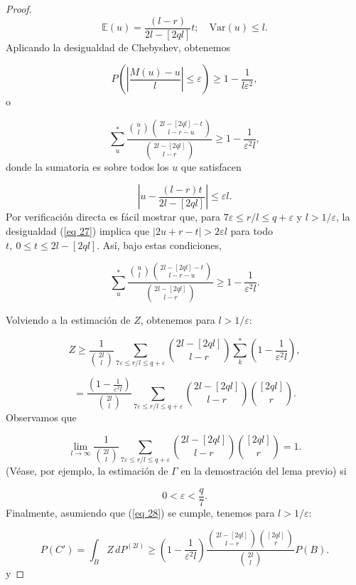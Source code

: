 \documentclass{report}
\begin{document}
\begin{proof}
\[
\mathbb{E}(u) = \frac{(l - r)}{2l - [2q l]} t; \quad \text{Var}(u) \leq l.
\]
Aplicando la desigualdad de Chebyshev, obtenemos

\[
P \left( \left| \frac{M(u) - u}{l} \right| \leq \varepsilon \right) \geq 1 - \frac{1}{l \varepsilon^2},
\]
o 

\[
\sum_u^* \frac{\binom{u}{l} \binom{2l - [2q l] - t}{l - r - u}}{\binom{2l - [2q l]}{l - r}} \geq 1 - \frac{1}{\varepsilon^2 l},
\]
donde la sumatoria es sobre todos los \( u \) que satisfacen

\begin{equation}\label{eq 27}
    \left| u - \frac{(l - r) t}{2l - [2q l]} \right| \leq \varepsilon l.
\end{equation}
Por verificación directa es fácil mostrar que, para \( 7 \varepsilon \leq r/l \leq q + \varepsilon \) y \( l > 1/\varepsilon \),
la desigualdad (\ref{eq 27}) implica que \( |2u + r - t| > 2 \varepsilon l \) para todo \( t, \ 0 \leq t \leq 2l - [2q l] \).
Así, bajo estas condiciones,

\[
\sum_u^* \frac{\binom{u}{l} \binom{2l - [2q l] - t}{l - r - u}}{\binom{2l - [2q l]}{l - r}} \geq 1 - \frac{1}{\varepsilon^2 l}.
\]\newline

Volviendo a la estimación de \( Z \), obtenemos para \( l > 1/\varepsilon \):

\[
Z \geq \frac{1}{\binom{2l}{l}} \sum_{7 \varepsilon \leq r/l \leq q + \varepsilon} \binom{2l - [2q l]}{l - r} \sum_k^* \left( 1 - \frac{1}{\varepsilon^2 l} \right),
\]

\[
= \frac{\left( 1 - \frac{1}{\varepsilon^2 l} \right)}{\binom{2l}{l}} \sum_{7 \varepsilon \leq r/l \leq q + \varepsilon} \binom{2l - [2q l]}{l - r} \binom{[2q l]}{r}.
\]
Observamos que

\[
\lim_{l \to \infty} \frac{1}{\binom{2l}{l}} \sum_{7 \varepsilon \leq r/l \leq q + \varepsilon} \binom{2l - [2q l]}{l - r} \binom{[2q l]}{r} = 1.
\]
(Véase, por ejemplo, la estimación de \( \Gamma \) en la demostración del lema previo) si 

\begin{equation}\label{eq 28}
0 < \varepsilon < \frac{q}{7}.
\end{equation}
Finalmente, asumiendo que (\ref{eq 28}) se cumple, tenemos para \( l > 1/\varepsilon \):

\[
P(C') = \int_B Z \, dP^{(2l)} \geq \left( 1 - \frac{1}{\varepsilon^2 l} \right) \frac{\binom{2l - [2q l]}{l - r} \binom{[2q l]}{r}}{\binom{2l}{l}} P(B).
\]
y 


\end{proof}
\end{document}
